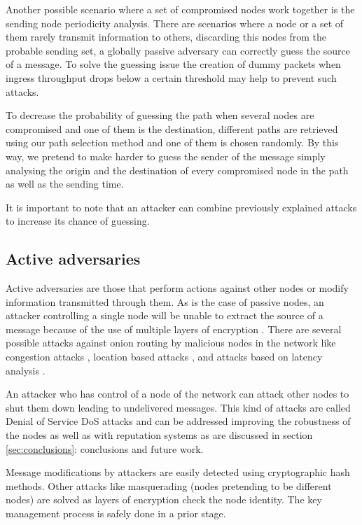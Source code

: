 Another possible scenario where a set of compromised nodes work together is the sending node periodicity analysis. There are scenarios where a node or a set of them rarely transmit information to others, discarding this nodes from the probable sending set, a globally passive adversary can correctly guess the source of a message. To solve the guessing issue the creation of dummy packets when ingress throughput drops below a certain threshold \cite{arden} may help to prevent such attacks.

To decrease the probability of guessing the path when several nodes are compromised and one of them is the destination, different paths are retrieved using our path selection method and one of them is chosen randomly. By this way, we pretend to make harder to guess the sender of the message simply analysing the origin and the destination of every compromised node in the path as well as the sending time.

It is  important to note that an attacker can combine previously explained attacks to increase its chance of guessing.

\subsection{Active adversaries}

Active adversaries are those that perform actions against other nodes or modify information transmitted through them. As is the case of passive nodes, an attacker controlling a single node will be unable to extract the source of a message because of the use of multiple layers of encryption \cite{arden}. There are several possible attacks against onion routing by malicious nodes in the network like congestion attacks \cite{congestion-attack}, location based attacks \cite{location-attack}, and attacks based on latency analysis \cite{latency-leak}.

An attacker who has control of a node of the network can attack other nodes to shut them down leading to undelivered messages. This kind of attacks are called Denial of Service DoS attacks and can be addressed improving the robustness of the nodes as well as with reputation systems as are discussed in section \ref{sec:conclusions}: conclusions and future work.

Message modifications by attackers are easily detected using cryptographic hash methods. Other attacks like masquerading (nodes pretending to be different nodes) are solved as layers of encryption check the node identity. The key management process is safely done in a prior stage.